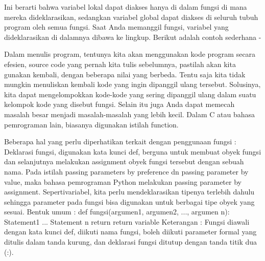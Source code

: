 Ini berarti bahwa variabel lokal dapat diakses hanya di dalam fungsi di mana mereka dideklarasikan, sedangkan variabel global dapat diakses di seluruh tubuh program oleh semua fungsi. Saat Anda memanggil fungsi, variabel yang dideklarasikan di dalamnya dibawa ke lingkup. Berikut adalah contoh sederhana - \par

Dalam   menulis   program, tentunya   kita   akan menggunakan kode program secara efesien, source code yang pernah kita tulis sebelumnya, pastilah akan kita  
gunakan  kembali,  dengan  beberapa  nilai  yang  berbeda. 
Tentu saja kita tidak mungkin menuliskan kembali  kode  yang  ingin  dipanggil  ulang  tersebut.  
Solusinya,  kita  dapat  mengelompokkan  kode-kode  yang sering dipanggil ulang dalam suatu kelompok kode yang disebut fungsi. 
Selain  itu  juga  Anda  dapat  memecah  masalah  besar  menjadi  masalah-masalah  yang  lebih  kecil.  Dalam  C  atau  bahasa  pemrograman  lain,  biasanya  digunakan istilah function. 

Beberapa hal yang perlu diperhatikan terkait dengan penggunaan fungsi :
Deklarasi fungsi, digunakan kata kunci def, berguna untuk membuat obyek fungsi dan selanjutnya melakukan assignment obyek fungsi tersebut dengan sebuah nama.
Pada istilah passing parameters by preference dn passing parameter by value, maka bahasa pemrograman Python melakukan passing parameter
by assignment.
Sepertivariabel, kita perlu mendeklarasikan tipenya terlebih dahulu sehingga parameter pada fungsi bisa digunakan untuk berbagai tipe obyek yang sesuai.
Bentuk umum :
def fungsi(argumen1, argumen2, ..., argumen n):
 Statement1
 ...
 Statement n
 return return variable
Keterangan : 
Fungsi diawali dengan kata kunci def, diikuti nama fungsi, boleh diikuti parameter formal yang ditulis dalam tanda kurung, dan deklarasi fungsi ditutup dengan tanda titik dua (:).

